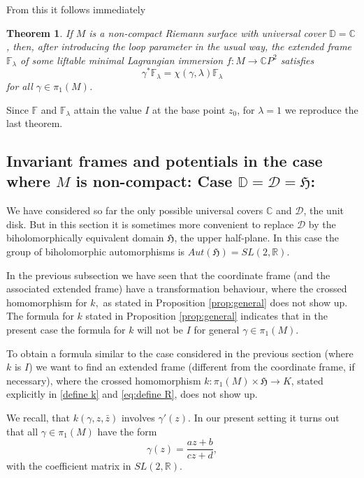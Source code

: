 \documentclass[a4paper,11pt]{amsart}
\newtheorem{theorem}{Theorem}[section]
\theoremstyle{definition}
\numberwithin{equation}{section}
\newcommand{\R}{\mathbb{R}}
\newcommand{\C}{\mathbb{C}}
\newcommand{\D}{\mathbb{D}}
\newcommand{\F}{\mathbb{F}}
\begin{document}
From this it follows immediately
\begin{theorem}
If $M$ is a non-compact Riemann surface with universal cover $\D = \C$, then, 
after introducing the loop parameter in the usual way,  the extended 
frame $\F_{\lambda}$ of some liftable minimal Lagrangian immersion 
$f: M \rightarrow \C P^2$ satisfies
$$\gamma^* \mathbb{F}_\lambda = 
\chi(\gamma,\lambda) \mathbb{F}_\lambda$$
for all $\gamma \in \pi_1(M)$.
\end{theorem}
Since $\mathbb{F}$ and $\mathbb{F}_\lambda $ attain the value $I$ at the base point $z_0$,
for $\lambda =1$ we reproduce the last theorem.


\subsection{Invariant frames  and potentials in the case where $M$ is non-compact: 
Case \texorpdfstring{$\D = \mathcal{D} = \mathfrak{H}$}{}: }\label{subsec:non-compact-H}

We have  considered so far the only possible universal covers $\C$ and $\mathcal{D}$, the unit disk. But in this section it is sometimes more convenient to
replace $\mathcal{D}$ by the biholomorphically equivalent domain $\mathfrak{H}$, the upper half-plane.
In this case the group of biholomorphic automorphisms is 
$Aut(\mathfrak{H}) = SL(2, \R)$.

In the previous subsection we have seen that the coordinate frame (and the associated extended frame) have a transformation behaviour, where
the crossed homomorphism for $k,$ as  stated in Proposition \ref{prop:general} does not show up.
The formula for $k$ stated in Proposition \ref{prop:general} indicates that in the present case the formula for $k$ will not be $I$
for general $\gamma \in \pi_1(M)$.

To obtain a formula similar to the case considered in the previous section (where $k$ is $I$)  we want to find an extended frame
(different from the coordinate frame, if necessary), where the crossed homomorphism 
$k: \pi_1(M)\times \mathfrak{H}\rightarrow K$, stated explicitly  
in  \eqref{define k} and \eqref{eq:define R}, does not show up.

We recall, that $k(\gamma,z, \bar z)$ involves $\gamma'(z)$.
In our present setting it turns out that all $\gamma \in \pi_1(M)$ have the form 
$$  \gamma(z) = \frac{az + b}{cz + d},$$
with the coefficient matrix in $SL(2,\R)$.
\end{document}
